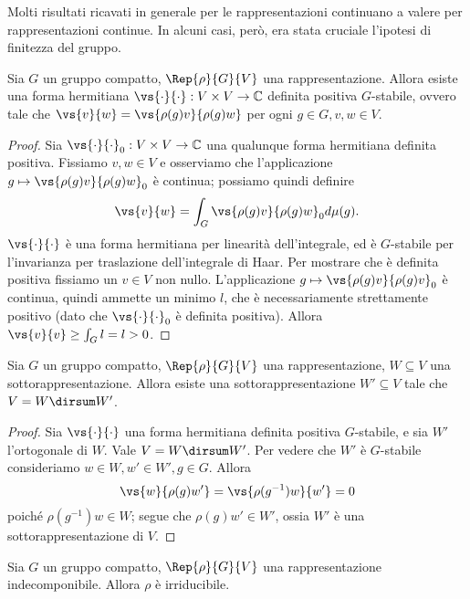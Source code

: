 Molti risultati ricavati in generale per le rappresentazioni continuano a valere per rappresentazioni continue. In alcuni casi, però, era stata cruciale l'ipotesi di finitezza del gruppo.

\begin{proposition}
Sia $G$ un gruppo compatto, $\Rep{\rho}{G}{V}$ una rappresentazione. Allora esiste una forma hermitiana $\vs{\cdot}{\cdot}:V\times V\to\mathbb{C}$ definita positiva $G$-stabile, ovvero tale che $\vs{v}{w}=\vs{\rho(g)v}{\rho(g)w}$ per ogni $g\in G\comma v,w\in V$.
\end{proposition}
\begin{proof}
Sia $\vs{\cdot}{\cdot}_0:V\times V\to \mathbb{C}$ una qualunque forma hermitiana definita positiva. Fissiamo $v,w\in V$ e osserviamo che l'applicazione $g\mapsto\vs{\rho(g)v}{\rho(g)w}_0$ è continua; possiamo quindi definire
$$
\vs{v}{w}=\int_G\vs{\rho(g)v}{\rho(g)w}_0d\mu(g).
$$
$\vs{\cdot}{\cdot}$ è una forma hermitiana per linearità dell'integrale, ed è $G$-stabile per l'invarianza per traslazione dell'integrale di Haar. Per mostrare che è definita positiva fissiamo un $v\in V$ non nullo. L'applicazione $g\mapsto\vs{\rho(g)v}{\rho(g)v}_0$ è continua, quindi ammette un minimo $l$, che è necessariamente strettamente positivo (dato che $\vs{\cdot}{\cdot}_0$ è definita positiva). Allora $\vs{v}{v}\ge\int_Gl=l>0$.
\end{proof}

\begin{proposition}
Sia $G$ un gruppo compatto, $\Rep{\rho}{G}{V}$ una rappresentazione, $W\subseteq V$ una sottorappresentazione. Allora esiste una sottorappresentazione $W'\subseteq V$ tale che $V=W\dirsum W'$.
\end{proposition}
\begin{proof}
Sia $\vs{\cdot}{\cdot}$ una forma hermitiana definita positiva $G$-stabile, e sia $W'$ l'ortogonale di $W$. Vale $V=W\dirsum W'$. Per vedere che $W'$ è $G$-stabile consideriamo $w\in W\comma w'\in W'\comma g\in G$. Allora
$$
\vs{w}{\rho(g)w'}=\vs{\rho(g^{-1})w}{w'}=0
$$
poiché $\rho(g^{-1})w\in W$; segue che $\rho(g)w'\in W'$, ossia $W'$ è una sottorappresentazione di $V$.
\end{proof}

\begin{corollary}
Sia $G$ un gruppo compatto, $\Rep{\rho}{G}{V}$ una rappresentazione indecomponibile. Allora $\rho$ è irriducibile.
\end{corollary}

